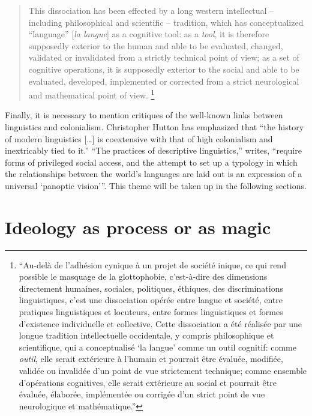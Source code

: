 \documentclass[output=paper]{langscibook}
\begin{document}
\begin{quotation}
This dissociation has been effected by a long western intellectual – including philosophical and scientific – tradition, which has conceptualized ``language'' [\emph{la langue}] as a cognitive tool: as a \emph{tool}, it is therefore supposedly exterior to the human and able to be evaluated, changed, validated or invalidated from a strictly technical point of view; as a set of cognitive operations, it is supposedly exterior to the social and able to be evaluated, developed, implemented or corrected from a strict neurological and mathematical point of view. \citep[73-73]{Blanchet2016}\footnote{``Au-delà de l'adhésion cynique à un projet de société inique, ce qui rend possible le masquage de la glottophobie, c'est-à-dire des dimensions directement humaines, sociales, politiques, éthiques, des discriminations linguistiques, c'est une dissociation opérée entre langue et société, entre pratiques linguistiques et locuteurs, entre formes linguistiques et formes d'existence individuelle et collective. Cette dissociation a été réalisée par une longue tradition intellectuelle occidentale, y compris philosophique et scientifique, qui a conceptualisé `la langue' comme un outil cognitif: comme \emph{outil}, elle serait extérieure à l'humain et pourrait être évaluée, modifiée, validée ou invalidée d'un point de vue strictement technique; comme ensemble d'opérations cognitives, elle serait extérieure au social et pourrait être évaluée, élaborée, implémentée ou corrigée d'un strict point de vue neurologique et mathématique.''}
\end{quotation}

Finally, it is necessary to mention critiques of the well-known links between linguistics and colonialism. Christopher Hutton has emphasized that ``the history of modern linguistics […] is coextensive with that of high colonialism and inextricably tied to it.'' ``The practices of descriptive linguistics,'' \citet[291]{Hutton2001} writes, ``require forms of privileged social access, and the attempt to set up a typology in which the relationships between the world's languages are laid out is an expression of a universal `panoptic vision'\thinspace''. This theme will be taken up in the following sections.

\section{Ideology as process or as magic}
\label{sec:riemer:ideologymagicprocess}
\end{document}
